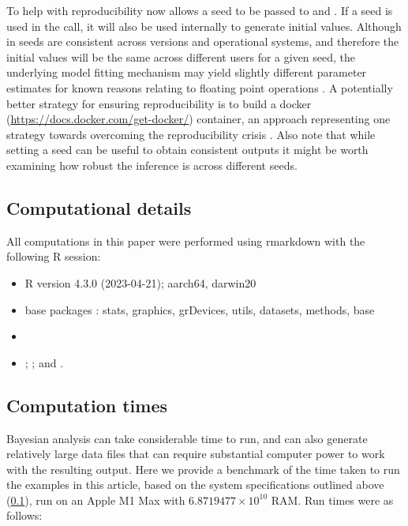 \documentclass[
  shortnames]{jss}
\begin{document}
To help with reproducibility  now allows a seed to be passed to  and . If a seed is used in the  call, it will also be used internally to generate initial values. Although in  seeds are consistent across versions and operational systems, and therefore the initial values will be the same across different users for a given seed, the underlying  model fitting mechanism may yield slightly different parameter estimates for known reasons relating to floating point operations \citep[see chapter 20 in][]{stan2021}. A potentially better strategy for ensuring reproducibility is to build a docker (\url{https://docs.docker.com/get-docker/}) container, an approach representing one strategy towards overcoming the reproducibility crisis \citep{Baker2016}. Also note that while setting a seed can be useful to obtain consistent outputs it might be worth examining how robust the inference is across different seeds.

\subsection[Computational detail]{Computational details}\label{compdetails}

All computations in this paper were performed using rmarkdown \citep{allaire2023} with the following
R session:

\begin{itemize}
\item
  R version 4.3.0 (2023-04-21); aarch64, darwin20
\item
  base packages \citep{rcore}: stats, graphics, grDevices, utils, datasets, methods, base
\item
   \citep{bayesnec2103}
\item
   \citep{Burkner2017};  \citep{ggplot}; and  \citep{rcpp}.
\end{itemize}

\hypertarget{computation-times}{%
\subsection{Computation times}\label{computation-times}}

Bayesian analysis can take considerable time to run, and can also generate relatively large data files that can require substantial computer power to work with the resulting output. Here we provide a benchmark of the time taken to run the examples in this article, based on the system specifications outlined above (\ref{compdetails}), run on an Apple M1 Max with \ensuremath{6.8719477\times 10^{10}} RAM. Run times were as follows:
\end{document}
